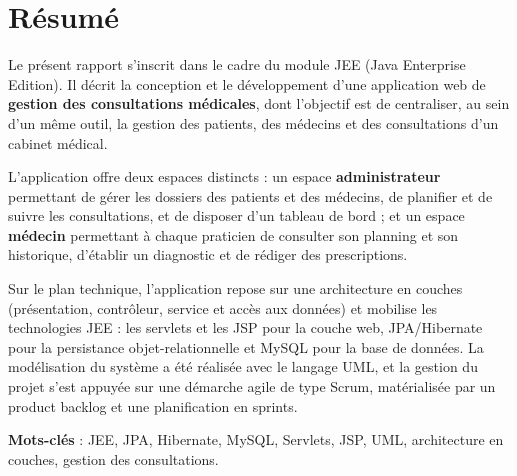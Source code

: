 \chapter*{Résumé}

Le présent rapport s'inscrit dans le cadre du module JEE (Java Enterprise Edition). Il décrit la conception et le développement d'une application web de \textbf{gestion des consultations médicales}, dont l'objectif est de centraliser, au sein d'un même outil, la gestion des patients, des médecins et des consultations d'un cabinet médical.

L'application offre deux espaces distincts : un espace \textbf{administrateur} permettant de gérer les dossiers des patients et des médecins, de planifier et de suivre les consultations, et de disposer d'un tableau de bord ; et un espace \textbf{médecin} permettant à chaque praticien de consulter son planning et son historique, d'établir un diagnostic et de rédiger des prescriptions.

Sur le plan technique, l'application repose sur une architecture en couches (présentation, contrôleur, service et accès aux données) et mobilise les technologies JEE : les servlets et les JSP pour la couche web, JPA/Hibernate pour la persistance objet-relationnelle et MySQL pour la base de données. La modélisation du système a été réalisée avec le langage UML, et la gestion du projet s'est appuyée sur une démarche agile de type Scrum, matérialisée par un product backlog et une planification en sprints.

\textbf{Mots-clés} : JEE, JPA, Hibernate, MySQL, Servlets, JSP, UML, architecture en couches, gestion des consultations.

\newpage
